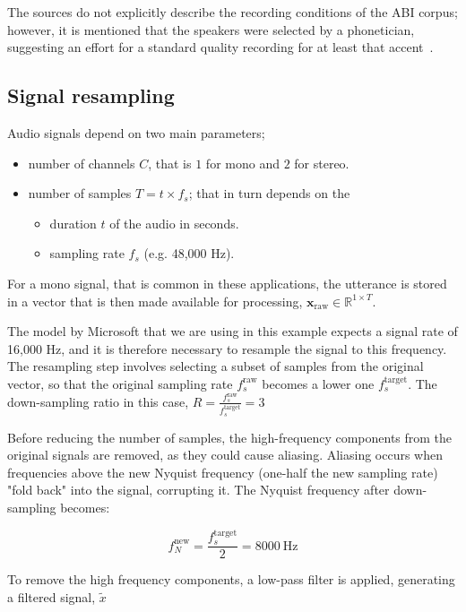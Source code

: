 \documentclass[conference]{IEEEtran}
\begin{document}
	The sources do not explicitly describe the recording conditions of the ABI corpus; however, it is mentioned that the speakers were selected by a phonetician, suggesting an effort for a standard quality recording for at least that accent~\cite{najafian2016improving}.
	
	
	\subsection{Signal resampling}
	\label{ssec:signal-resampling}
	
	Audio signals depend on two main parameters;
	
	\begin{itemize}
		\item number of channels $C$, that is $1$ for mono and $2$ for stereo.
		\item number of samples $T = t \times f_s$; that in turn depends on the
		\begin{itemize}
			\item duration $t$ of the audio in seconds.
			\item sampling rate $f_s$ (e.g. 48,000 Hz).
		\end{itemize}
	\end{itemize}
	
	For a mono signal, that is common in these applications, the utterance is stored in a vector that is then made available for processing,  $\mathbf{x}_{\text{raw}} \in \mathbb{R}^{1 \times T}$.
	
	The model by Microsoft that we are using in this example expects a signal rate of 16,000 Hz, and it is therefore necessary to resample the signal to this frequency. The resampling step involves selecting a subset of samples from the original vector, so that the original sampling rate $f_s^{\text{raw}}$ becomes a lower one $f_s^{\text{target}}$. The down-sampling ratio in this case, $R = \frac{f_s^{\text{raw}}}{f_s^{\text{target}}} = 3$
	
	Before reducing the number of samples, the high-frequency components from the original signals are removed, as they could cause aliasing. Aliasing occurs when frequencies above the new Nyquist frequency (one-half the new sampling rate) "fold back" into the signal, corrupting it. The Nyquist frequency after down-sampling becomes:
	
	$$f_N^{\text{new}} = \frac{f_s^{\text{target}}}{2} = 8000~\text{Hz}$$
	
	To remove the high frequency components, a low-pass filter is applied, generating a filtered signal, $\tilde{x}$
	
\end{document}
